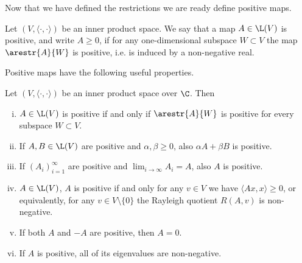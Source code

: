 Now that we have defined the restrictions we are ready define positive maps.

\begin{maar}
	Let $(V, \langle \cdot, \cdot \rangle)$ be an inner product space. We say that a map $A \in \L(V)$ is positive, and write $A \geq 0$, if for any one-dimensional subspace $W \subset V$ the map $\arestr{A}{W}$ is positive, i.e. is induced by a non-negative real.
\end{maar}

Positive maps have the following useful properties.

\begin{prop}
	Let $(V, \langle \cdot, \cdot \rangle)$ be an inner product space over $\C$. Then
	\begin{enumerate}[(i)]
		\item $A \in \L(V)$ is positive if and only if $\arestr{A}{W}$ is positive for every subspace $W \subset V$.
		\item If $A, B \in \L(V)$ are positive and $\alpha, \beta \geq 0$, also $\alpha A + \beta B$ is positive.
		\item If $(A_{i})_{i = 1}^{\infty}$ are positive and $\lim_{i \to \infty} A_{i} = A$, also $A$ is positive.
		\item $A \in \L(V)$, $A$ is positive if and only for any $v \in V$ we have $\langle A x, x \rangle \geq 0$, or equivalently, for any $v \in V \setminus \{0\}$ the Rayleigh quotient $R(A, v)$ is non-negative.
		\item If both $A$ and $-A$ are positive, then $A = 0$.
		\item If $A$ is positive, all of its eigenvalues are non-negative.
	\end{enumerate}
\end{prop}
